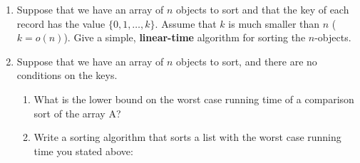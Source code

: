 \begin{enumerate}
	\item Suppose that we have an array of $n$ objects to sort and that
		the key of each record has the value $\{0,1,\ldots,k\}$. Assume that
		$k$ is much smaller than $n$ ($k = o(n)$).   Give a simple,
		{\bf linear-time} algorithm for sorting the $n$-objects.
		\vspace{3in}
		
	\item Suppose that we have an array of $n$ objects to sort, and there
		are no conditions on the keys.  
		\begin{enumerate}
			\item What is the lower bound on the worst case running time of 
				a comparison sort of the array A?
				\vspace{.75in}
			\item Write a sorting algorithm that sorts a list with the worst case
				running time you stated above:
				\vspace{3in}
		\end{enumerate}

		
\end{enumerate}




